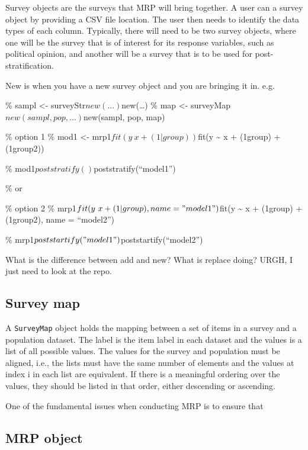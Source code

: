 \documentclass[
]{jss}
\begin{document}
Survey objects are the surveys that MRP will bring together. A user can
 a survey object by providing a CSV file location. The
user then needs to identify the data types of each column. Typically,
there will need to be two survey objects, where one will be the survey
that is of interest for its response variables, such as political
opinion, and another will be a survey that is to be used for
post-stratification.

New is when you have a new survey object and you are bringing it in.
e.g.

\% sampl \textless- surveyStr\(new(...) %
\)new(\ldots) \% map \textless-
surveyMap\(new(sampl, pop, ...) %
\)new(sampl, pop, map)

\% option 1 \% mod1 \textless-
mrp1\(fit(y ~ x + (1|group)) %
\)fit(y \textasciitilde{} x + (1\textbar group) + (1\textbar group2))

\% mod1\(poststratify() %
\)poststratify(``model1'')

\% or

\% option 2 \% mrp1\(fit(y ~ x + (1|group), name = "model1") %
\)fit(y \textasciitilde{} x + (1\textbar group) + (1\textbar group2),
name = ``model2'')

\% mrp1\(poststartify("model1") %
\)poststartify(``model2'')

What is the difference between add and new? What is replace doing? URGH,
I just need to look at the repo.

\subsection*{Survey map}

A \texttt{SurveyMap} object holds the mapping between a set of items in
a survey and a population dataset. The label is the item label in each
dataset and the values is a list of all possible values. The values for
the survey and population must be aligned, i.e., the lists must have the
same number of elements and the values at index i in each list are
equivalent. If there is a meaningful ordering over the values, they
should be listed in that order, either descending or ascending.

One of the fundamental issues when conducting MRP is to ensure that

\subsection*{MRP object}
\end{document}
